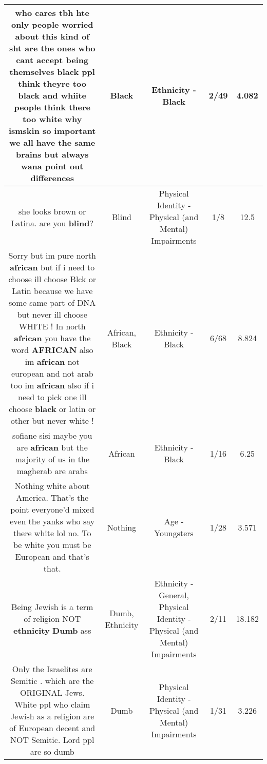 \documentclass[11pt]{article}
\newlength\mylength
\begin{document}
\begin{center}
\begin{longtable}{|C{.65\mylength}|C{.30\mylength}|C{.12\mylength}|C{.12\mylength}|C{.12\mylength}|}
  \small who cares tbh hte only people worried about this kind of sht are the ones who cant accept being themselves \textbf{black} ppl think theyre too \textbf{black} and whiite people think there too white why ismskin so important we all have the same brains but always wana point out differences\normalsize   & Black & Ethnicity - Black & 2/49 & 4.082 \\  \hline
  \small she looks brown or Latina.  are you \textbf{blind}?\normalsize   & Blind & Physical Identity - Physical (and Mental) Impairments & 1/8 & 12.5 \\  \hline
  \small Sorry but im pure north \textbf{african} but if i need to choose ill choose Blck or Latin because we have some same part of DNA but never ill choose WHITE ! In north \textbf{african} you have the word \textbf{AFRICAN} also im \textbf{african} not european and not arab too im \textbf{african} also if i need to pick one ill choose \textbf{black} or latin or other but never white !\normalsize   & African, Black & Ethnicity - Black & 6/68 & 8.824 \\  \hline
  \small sofiane sisi maybe you are \textbf{african} but the majority of us in the magherab are arabs\normalsize   & African & Ethnicity - Black & 1/16 & 6.25 \\  \hline
  \small Nothing white about America. That's the point everyone'd mixed even the yanks who say there white lol no. To be white you must be European and that's that.\normalsize   & Nothing & Age - Youngsters & 1/28 & 3.571 \\  \hline
  \small Being Jewish is a term of religion NOT \textbf{ethnicity} \textbf{Dumb} ass\normalsize   & Dumb, Ethnicity & Ethnicity - General, Physical Identity - Physical (and Mental) Impairments & 2/11 & 18.182 \\  \hline
  \small Only the Israelites are Semitic . which are the ORIGINAL Jews. White ppl who claim Jewish as a religion are of European decent and NOT Semitic. Lord ppl are so dumb\normalsize   & Dumb & Physical Identity - Physical (and Mental) Impairments & 1/31 & 3.226 \\  \hline

\end{longtable}
\end{center}
\end{document}
